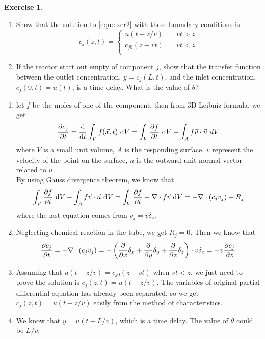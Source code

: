 \documentclass[11pt,a4paper]{report}
\theoremstyle{definition}\newtheorem{exercise}{Exercise}[chapter]
\begin{document}
\begin{exercise}
\begin{enumerate}[label=(\alph*)]
    \item Show that the solution to \eqref{equ:exer2} with these boundary conditions is 
    \begin{equation}
        c_j(z,t) = 
        \begin{cases}
            u(t-z/v) & \quad vt>z\\
            c_{j0}(z-vt) & \quad vt<z\\ 
        \end{cases}
    \end{equation}
    \item If the reactor start out empty of component $j$, show that the transfer function between the outlet concentration, $y=c_j(L,t)$, and the inlet concentration, $c_j(0,t)=u(t)$, is a time delay. What is the value of $\theta$?
\end{enumerate}
\end{exercise}

\begin{answer}
\begin{enumerate}[label=(\alph*)]
    \item let $f$ be the moles of one of the component, then from 3D Leibniz formula, we get 
    \begin{equation}
        \pdv{c_j}{t}=\dv{}{t}\int_{V}f(\vec x,t)~\mathrm{d}V = 
        \int_V \pdv{f}{t}~\mathrm{d}V - 
        \int_A f\vec v\cdot \vec n\mathrm~{d}V
    \end{equation}
    where $V$ is a small unit volume, $A$ is the responding surface, $v$ represent the velocity of the point on the surface, $n$ is the outward unit normal vector related to $u$.\\
    By using Gauss divergence theorem, we know that
    \begin{equation}
        \int_V \pdv{f}{t}~\mathrm{d}V -
        \int_A f\vec v\cdot \vec n~\mathrm{d}V =
        \int_V \pdv{f}{t} - \nabla \cdot f\vec v~\mathrm{d}V = 
        -\nabla\cdot(c_j v_j)+R_j
    \end{equation} 
    where the last equation comes from $v_j=v\delta_z$.

    \item Neglecting chemical reaction in the tube, we get $R_j=0$. Then we know that
    \begin{equation}
        \pdv{c_j}{t}=-\nabla\cdot(c_j v_j)=
        -\left(\pdv{}{x}\delta_x+\pdv{}{y}\delta_y+\pdv{}{z}\delta_z\right)\cdot v\delta_z=-v\pdv{c_j}{z}
    \end{equation}

    \item Assuming that $u(t-z/v)=c_{j0}(z-vt)$ when $vt<z$, we just need to prove the solution is $c_j(z,t)=u(t-z/v)$. The variables of original partial differential equation has already been separated, so we get $c_j(z,t)=u(t-z/v)$ easily from the method of characteristics.

    \item We know that $y=u(t-L/v)$, which is a time delay. The value of $\theta$ could be $L/v$.
\end{enumerate}
\end{answer}
\end{document}
